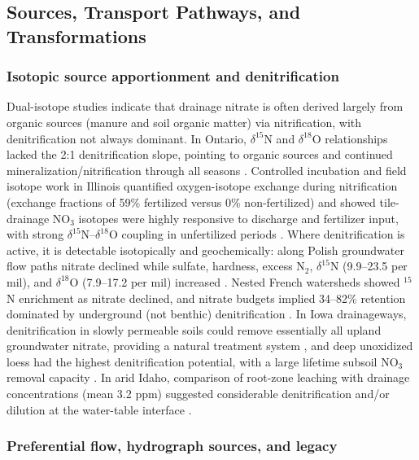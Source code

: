 \subsection{Sources, Transport Pathways, and Transformations}

\subsubsection{Isotopic source apportionment and denitrification}

Dual-isotope studies indicate that drainage nitrate is often derived largely from organic sources (manure and soil organic matter) via nitrification, with denitrification not always dominant. In Ontario, $\delta^{15}$N and $\delta^{18}$O relationships lacked the 2:1 denitrification slope, pointing to organic sources and continued mineralization/nitrification through all seasons \parencite{Smith2011,Smith2011b}. Controlled incubation and field isotope work in Illinois quantified oxygen-isotope exchange during nitrification (exchange fractions of 59\% fertilized versus 0\% non-fertilized) and showed tile-drainage NO$_3$ isotopes were highly responsive to discharge and fertilizer input, with strong $\delta^{15}$N--$\delta^{18}$O coupling in unfertilized periods \parencite{Hu2024}. Where denitrification is active, it is detectable isotopically and geochemically: along Polish groundwater flow paths nitrate declined while sulfate, hardness, excess N$_2$, $\delta^{15}$N (9.9--23.5 per mil), and $\delta^{18}$O (7.9--17.2 per mil) increased \parencite{Dragon2016}. Nested French watersheds showed $^{15}$N enrichment as nitrate declined, and nitrate budgets implied 34--82\% retention dominated by underground (not benthic) denitrification \parencite{Billy2011,Billy2013}. In Iowa drainageways, denitrification in slowly permeable soils could remove essentially all upland groundwater nitrate, providing a natural treatment system \parencite{Schilling2007}, and deep unoxidized loess had the highest denitrification potential, with a large lifetime subsoil NO$_3$ removal capacity \parencite{Cambardella1999}. In arid Idaho, comparison of root-zone leaching with drainage concentrations (mean 3.2 ppm) suggested considerable denitrification and/or dilution at the water-table interface \parencite{ROBBINS1980}.

\subsubsection{Preferential flow, hydrograph sources, and legacy}

